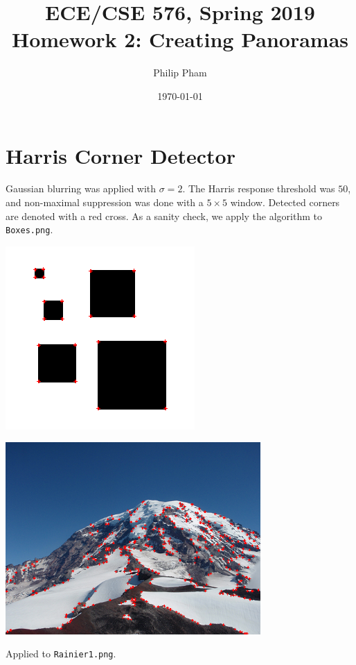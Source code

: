 \documentclass[letterpaper]{article}
\author{Philip Pham}
\title{\Large ECE/CSE 576, Spring 2019 Homework 2: Creating Panoramas}
\date{\today}
\begin{document}
\maketitle

\section{Harris Corner Detector}
\label{sec:harris}
Gaussian blurring was applied with $\sigma = 2$. The Harris response threshold
was $50$, and non-maximal suppression was done with a $5 \times 5$
window. Detected corners are denoted with a red cross. As a sanity check, we
apply the algorithm to \texttt{Boxes.png}.

\begin{center}
  \includegraphics{1a.png}  
\end{center}

\begin{center}
  \includegraphics[width=0.73\textwidth]{1b.png}
  
  Applied to \texttt{Rainier1.png}.
\end{center}
\end{document}
